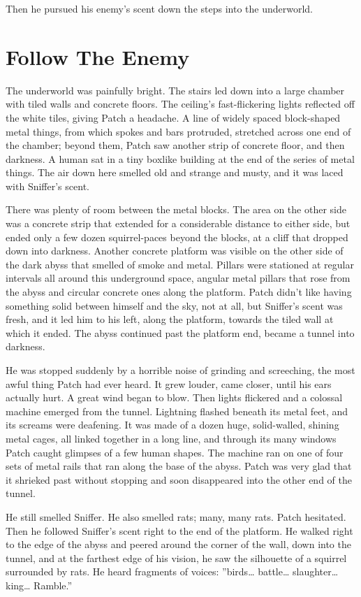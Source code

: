 \documentclass[12pt]{book}
\begin{document}
Then he pursued his enemy's scent down the steps into the underworld.


\section{Follow The Enemy}

The underworld was painfully bright. The stairs led down into a large
chamber with tiled walls and concrete floors. The ceiling's
fast-flickering lights reflected off the white tiles, giving Patch a
headache. A line of widely spaced block-shaped metal things, from
which spokes and bars protruded, stretched across one end of the
chamber; beyond them, Patch saw another strip of concrete floor, and
then darkness. A human sat in a tiny boxlike building at the end of
the series of metal things. The air down here smelled old and strange
and musty, and it was laced with Sniffer's scent.

There was plenty of room between the metal blocks. The area on the
other side was a concrete strip that extended for a considerable
distance to either side, but ended only a few dozen squirrel-paces
beyond the blocks, at a cliff that dropped down into darkness. Another
concrete platform was visible on the other side of the dark abyss that
smelled of smoke and metal. Pillars were stationed at regular
intervals all around this underground space, angular metal pillars
that rose from the abyss and circular concrete ones along the
platform. Patch didn't like having something solid between himself and
the sky, not at all, but Sniffer's scent was fresh, and it led him to
his left, along the platform, towards the tiled wall at which it
ended. The abyss continued past the platform end, became a tunnel into
darkness.

He was stopped suddenly by a horrible noise of grinding and
screeching, the most awful thing Patch had ever heard. It grew louder,
came closer, until his ears actually hurt. A great wind began to
blow. Then lights flickered and a colossal machine emerged from the
tunnel. Lightning flashed beneath its metal feet, and its screams were
deafening. It was made of a dozen huge, solid-walled, shining metal
cages, all linked together in a long line, and through its many
windows Patch caught glimpses of a few human shapes. The machine ran
on one of four sets of metal rails that ran along the base of the
abyss. Patch was very glad that it shrieked past without stopping and
soon disappeared into the other end of the tunnel.

He still smelled Sniffer. He also smelled rats; many, many rats. Patch
hesitated. Then he followed Sniffer's scent right to the end of the
platform. He walked right to the edge of the abyss and peered around
the corner of the wall, down into the tunnel, and at the farthest edge
of his vision, he saw the silhouette of a squirrel surrounded by
rats. He heard fragments of voices: ''birds\ldots{} battle\ldots{}
slaughter\ldots{} king\ldots{} Ramble.''
\end{document}
